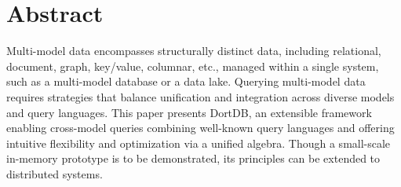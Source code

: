 


\section*{Abstract}

Multi-model data encompasses structurally distinct data, including relational, document, graph, key/value, columnar,  etc., managed within a single system, such as a multi-model database or a data lake. Querying multi-model data requires strategies that balance unification and integration across diverse models and query languages. This paper presents DortDB, an extensible framework enabling cross-model queries combining well-known query languages and offering intuitive flexibility %
and optimization via a unified algebra. Though a small-scale in-memory prototype is to be demonstrated, its principles can be extended to distributed systems.





